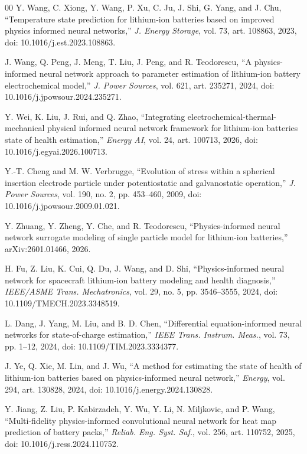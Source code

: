 \documentclass[conference]{IEEEtran}
\begin{document}
\begin{thebibliography}{00}
Y. Wang, C. Xiong, Y. Wang, P. Xu, C. Ju, J. Shi, G. Yang, and J. Chu, ``Temperature state prediction for lithium-ion batteries based on improved physics informed neural networks,'' \emph{J. Energy Storage}, vol. 73, art. 108863, 2023, doi: 10.1016/j.est.2023.108863.

J. Wang, Q. Peng, J. Meng, T. Liu, J. Peng, and R. Teodorescu, ``A physics-informed neural network approach to parameter estimation of lithium-ion battery electrochemical model,'' \emph{J. Power Sources}, vol. 621, art. 235271, 2024, doi: 10.1016/j.jpowsour.2024.235271.

Y. Wei, K. Liu, J. Rui, and Q. Zhao, ``Integrating electrochemical-thermal-mechanical physical informed neural network framework for lithium-ion batteries state of health estimation,'' \emph{Energy AI}, vol. 24, art. 100713, 2026, doi: 10.1016/j.egyai.2026.100713.

Y.-T. Cheng and M. W. Verbrugge, ``Evolution of stress within a spherical insertion electrode particle under potentiostatic and galvanostatic operation,'' \emph{J. Power Sources}, vol. 190, no. 2, pp. 453--460, 2009, doi: 10.1016/j.jpowsour.2009.01.021.

Y. Zhuang, Y. Zheng, Y. Che, and R. Teodorescu, ``Physics-informed neural network surrogate modeling of single particle model for lithium-ion batteries,'' arXiv:2601.01466, 2026.

H. Fu, Z. Liu, K. Cui, Q. Du, J. Wang, and D. Shi, ``Physics-informed neural network for spacecraft lithium-ion battery modeling and health diagnosis,'' \emph{IEEE/ASME Trans. Mechatronics}, vol. 29, no. 5, pp. 3546--3555, 2024, doi: 10.1109/TMECH.2023.3348519.

L. Dang, J. Yang, M. Liu, and B. D. Chen, ``Differential equation-informed neural networks for state-of-charge estimation,'' \emph{IEEE Trans. Instrum. Meas.}, vol. 73, pp. 1--12, 2024, doi: 10.1109/TIM.2023.3334377.

J. Ye, Q. Xie, M. Lin, and J. Wu, ``A method for estimating the state of health of lithium-ion batteries based on physics-informed neural network,'' \emph{Energy}, vol. 294, art. 130828, 2024, doi: 10.1016/j.energy.2024.130828.

Y. Jiang, Z. Liu, P. Kabirzadeh, Y. Wu, Y. Li, N. Miljkovic, and P. Wang, ``Multi-fidelity physics-informed convolutional neural network for heat map prediction of battery packs,'' \emph{Reliab. Eng. Syst. Saf.}, vol. 256, art. 110752, 2025, doi: 10.1016/j.ress.2024.110752.


\end{thebibliography}
\end{document}
